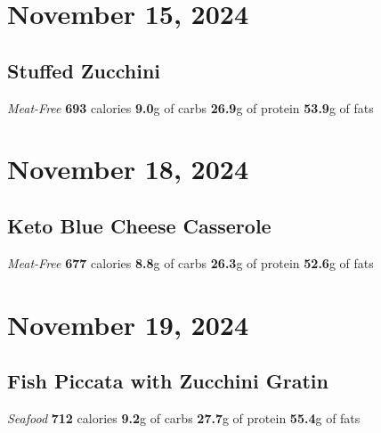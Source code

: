 \documentclass{article}%
\begin{document}
%
\section*{November 15, 2024}%
\label{sec:November15,2024}%
\begin{paracol}[1]{1}%
\sloppy%
\subsection*{Stuffed Zucchini}%
\label{subsec:StuffedZucchini}%
\textit{Meat{-}Free}%
\newline%
\newline%
\textbf{693} calories%
\newline%
\textbf{9.0}g of carbs%
\newline%
\textbf{26.9}g of protein%
\newline%
\textbf{53.9}g of fats%
\newline%
\switchcolumn

%
\end{paracol}

%
\section*{November 18, 2024}%
\label{sec:November18,2024}%
\begin{paracol}[1]{1}%
\sloppy%
\subsection*{Keto Blue Cheese Casserole}%
\label{subsec:KetoBlueCheeseCasserole}%
\textit{Meat{-}Free}%
\newline%
\newline%
\textbf{677} calories%
\newline%
\textbf{8.8}g of carbs%
\newline%
\textbf{26.3}g of protein%
\newline%
\textbf{52.6}g of fats%
\newline%
\switchcolumn

%
\end{paracol}

%
\section*{November 19, 2024}%
\label{sec:November19,2024}%
\begin{paracol}[1]{1}%
\sloppy%
\subsection*{Fish Piccata with Zucchini Gratin}%
\label{subsec:FishPiccatawithZucchiniGratin}%
\textit{Seafood}%
\newline%
\newline%
\textbf{712} calories%
\newline%
\textbf{9.2}g of carbs%
\newline%
\textbf{27.7}g of protein%
\newline%
\textbf{55.4}g of fats%
\newline%
\switchcolumn

%
\end{paracol}

%
\end{document}

